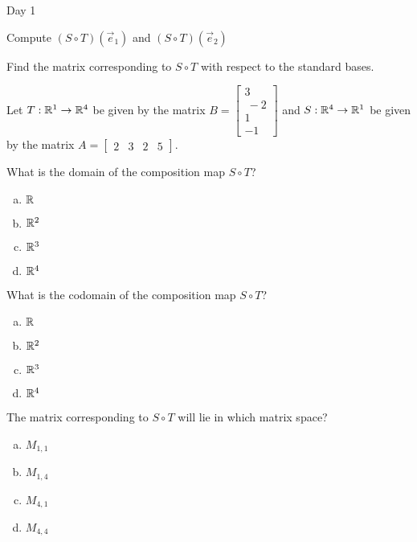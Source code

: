 \begin{applicationActivities}{Day 1}
\begin{activity}{0}
Compute $(S \circ T)(\vec{e}_1)$ and $(S \circ T)(\vec{e}_2)$
\end{activity}

\begin{activity}{0}
Find the matrix corresponding to $S \circ T$ with respect to the standard bases.
\end{activity}

\begin{activity}{0}
Let $T: \mathbb{R}^1 \rightarrow \mathbb{R}^4$ be given by the matrix $B=\begin{bmatrix} 3 \\\ -2 \\ 1 \\ -1\end{bmatrix}$ and $S: \mathbb{R}^4 \rightarrow \mathbb{R}^1$ be given by the matrix $A=\begin{bmatrix}2 & 3 & 2 & 5 \end{bmatrix}$.

What is the domain of the composition map $S \circ T$?
\begin{enumerate}[(a)]
\item $\mathbb{R}$
\item $\mathbb{R}^2$
\item $\mathbb{R}^3$
\item $\mathbb{R}^4$
\end{enumerate}
\end{activity}

\begin{activity}{0}
What is the codomain of the composition map $S \circ T$?
\begin{enumerate}[(a)]
\item $\mathbb{R}$
\item $\mathbb{R}^2$
\item $\mathbb{R}^3$
\item $\mathbb{R}^4$
\end{enumerate}
\end{activity}

\begin{activity}{0}
The matrix corresponding to $S \circ T$ will lie in which matrix space?
\begin{enumerate}[(a)]
\item $M_{1,1}$
\item $M_{1,4}$
\item $M_{4,1}$
\item $M_{4,4}$
\end{enumerate}
\end{activity}


\end{applicationActivities}
